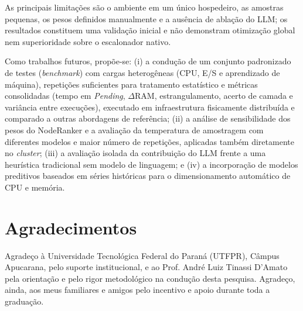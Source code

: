 \documentclass[11pt,a4paper]{article}
\begin{document}
As principais limitações são o ambiente em um único hospedeiro, as amostras
pequenas, os pesos definidos manualmente e a ausência de ablação do LLM; os
resultados constituem uma validação inicial e não demonstram otimização
global nem superioridade sobre o escalonador nativo.

Como trabalhos futuros, propõe-se: (i) a condução de um conjunto padronizado de testes (\textit{benchmark}) com cargas heterogêneas (CPU, E/S e aprendizado de máquina), repetições suficientes para tratamento estatístico e métricas consolidadas (tempo em \textit{Pending}, $\Delta$RAM, estrangulamento, acerto de camada e variância entre execuções), executado em infraestrutura fisicamente distribuída e comparado a outras abordagens de referência; (ii) a análise de sensibilidade dos pesos do NodeRanker e a avaliação da temperatura de amostragem com diferentes modelos e maior número de repetições, aplicadas também diretamente no \textit{cluster}; (iii) a avaliação isolada da contribuição do LLM frente a uma heurística tradicional sem modelo de linguagem; e (iv) a incorporação de modelos preditivos baseados em séries históricas para o dimensionamento automático de CPU e memória.



\section*{Agradecimentos}

Agradeço à Universidade Tecnológica Federal do Paraná (UTFPR), Câmpus Apucarana, pelo suporte institucional, e ao Prof. André Luiz Tinassi D'Amato pela orientação e pelo rigor metodológico na condução desta pesquisa. Agradeço, ainda, aos meus familiares e amigos pelo incentivo e apoio durante toda a graduação.
\end{document}
